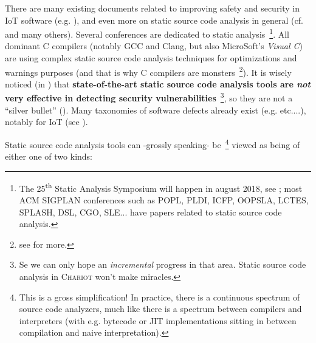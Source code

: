 There are many existing documents related to improving safety and
security in IoT software (e.g. \cite{Chen:2011:DAS, Medwed:2016:ISC}),
and even more on static source code analysis in general
(cf. \cite{Gomes2009AnOO, GosevaPopstojanova2015OnTC,
  Binkley:2007:SCA} and many others). Several conferences are
dedicated to static analysis~\footnote{The 25\textsuperscript{th}
  Static Analysis Symposium will happen in august 2018, see
  ; most ACM
  SIGPLAN conferences such as POPL, PLDI, ICFP, OOPSLA, LCTES, SPLASH,
  DSL, CGO, SLE... have papers related to static source code
  analysis.}. All dominant C compilers (notably GCC and Clang, but
also MicroSoft's \emph{Visual C}\texttrademark) are using complex static source code analysis techniques
for optimizations and warnings purposes (and that is why C compilers
are monsters~\footnote{see
  for more.}). It is wisely noticed (in
\cite{GosevaPopstojanova2015OnTC}) that \textbf{state-of-the-art
  static source code analysis tools are \emph{not} very effective in
  detecting  security
  vulnerabilities}~\footnote{Se we can only hope an \emph{incremental}
  progress in that area. Static source code analysis in
  \textsc{Chariot} won't make miracles.}, so they are not a ``silver
bullet''  (\cite{Brooks:1987:NSB}). Many
taxonomies of software defects  already exist
(e.g. \cite{Silva:2016:SES, Wagner:2008:DCD, Levine:2009:DDE}
etc....), notably for IoT (see \cite{Carpent:2018:RRA,
  Ahmad:2018:ModelBasedIoT, Laszlo:2018:Vessedia}).

Static source code analysis tools can -grossly speaking-
be~\footnote{This is a gross simplification! In practice, there is a
  continuous spectrum of source code analyzers, much like there is a
  spectrum between compilers and interpreters (with e.g. bytecode or
  JIT implementations sitting in between compilation and naive
  interpretation).} viewed as being of either one of two kinds:

